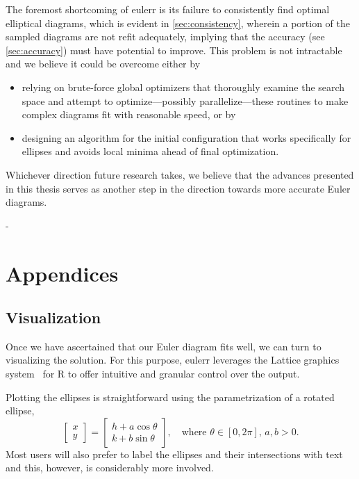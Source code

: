 \documentclass[
  oneside,
  openany,
  numbers=noendperiod,
  parskip=half,
  bibliography=totoc
]{scrbook}\usepackage[]{graphicx}\usepackage{xcolor}
\newlength{\overhang}
\newenvironment{fullwidth}{%
  \blockmargin
  \begin{addmargin*}[0em]{-\overhang}%
}{%
  \end{addmargin*}%
  \unblockmargin
}
\newcommand{\pkg}[1]{{\fontseries{b}\selectfont #1}}
\begin{document}
The foremost shortcoming of \pkg{eulerr} is its failure to consistently
find optimal elliptical diagrams, which is evident in \cref{sec:consistency},
wherein a portion of the sampled diagrams are not refit adequately,
implying that the accuracy (see \cref{sec:accuracy})
must have potential to improve. This problem is not intractable and we
believe it could be overcome either by
\begin{itemize}
\item relying on brute-force global optimizers that thoroughly examine
the search space and attempt to optimize---possibly parallelize---these routines
to make complex diagrams fit with reasonable speed, or by
\item designing an algorithm for the initial configuration that works
specifically for ellipses and avoids local minima ahead of final
optimization.
\end{itemize}
Whichever direction future research takes, we believe that the advances
presented in this thesis serves as another step in the direction towards more
accurate Euler diagrams.

\begin{fullwidth}
\part*{Appendices}
\end{fullwidth}
\appendix
\chapter{Visualization}
\label{ap:visualization}

Once we have ascertained that our Euler diagram fits well, we can turn to
visualizing the solution. For this purpose, \pkg{eulerr} leverages the
\pkg{Lattice} graphics system~\citep{Sarkar_2008} for R to offer intuitive and
granular control over the output.

Plotting the ellipses is straightforward using the parametrization of a rotated
ellipse,
%
\begin{equation*}
\begin{bmatrix}
  x \\ y
\end{bmatrix} =
\begin{bmatrix}
  h + a \cos{\theta} \\
  k + b \sin{\theta}
\end{bmatrix},\quad \text{where } \theta \in [0, 2\pi],\, a,b>0.
\end{equation*}
%
Most users will also prefer to label the ellipses and their intersections
with text and this, however, is considerably more involved.
\end{document}
